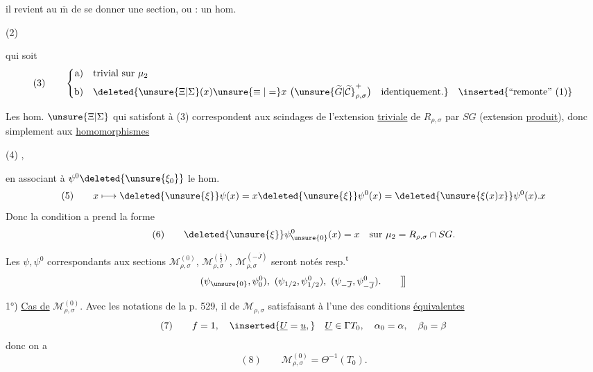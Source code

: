 
il revient au $\overline{\mathrm m}$ de se donner une section,
ou : un hom.

\noindent (2)\quad
{}

qui soit 
\[
\text{(3)}\qquad
\left\{\begin{aligned}
\text{a)}\quad &\text{trivial sur }\mu_2\\
\text{b)}\quad &\deleted{\unsure{\Xi|\Sigma}(x)\unsure{\equiv|=}x\ \bigl(\unsure{\widetilde G|\widetilde{\mathcal C}}^+_{\rho,\sigma}\bigr)\quad\text{identiquement}.}\quad\inserted{\text{``remonte'' (1)}}
\end{aligned}\right.
\]

Les hom. $\unsure{\Xi|\Sigma}$ qui satisfont à (3) correspondent
aux scindages de l'extension \uline{triviale} de
$R_{\rho,\sigma}$ par $SG$ (extension \uline{produit}), donc
simplement aux \uline{homomorphismes}

\noindent (4)\quad
{},



en associant à $\psi^0\deleted{\unsure{\xi_0}}$ le hom.
\[
(5)\qquad x\longmapsto \deleted{\unsure{\xi}}\psi(x)
=x\deleted{\unsure{\xi}}\psi^0(x)
=\deleted{\unsure{\xi(x)x}}\psi^0(x).x
\]
Donc la condition a prend la forme
\[
(6)\qquad \deleted{\unsure{\xi}}\psi^0_{\unsure{0}}(x)=x
\quad\text{sur }\mu_2=R_{\rho,\sigma}\cap SG.
\]

\margin{\deleted{\unsure{$\rho$}}}
Les $\psi,\psi^0$ correspondants aux  sections
$\mathcal M_{\rho,\sigma}^{(0)}$, $\mathcal M_{\rho,\sigma}^{(\frac12)}$,
$\mathcal M_{\rho,\sigma}^{(-\overline J)}$ seront notés resp.\textsuperscript{t}
\[
(\psi_{\unsure{0}},\psi^0_0),\ (\psi_{1/2},\psi^0_{1/2}),\
(\psi_{-\overline J},\psi^0_{-\overline J}).\qquad\big]\!\big]
\]

1°) \uline{Cas de} $\mathcal M_{\rho,\sigma}^{(0)}$. Avec les notations
de la p. 529, il \unsure{correspondra} 
\inserted{\unsure{$\underline u$}} de $\mathcal M_{\rho,\sigma}$ satisfaisant à l'une des conditions
\uline{équivalentes}
\[
(7)\qquad f=1,\quad\inserted{\underline U=\underline u,}\quad
\underline U\in\Gamma T_0,\quad \alpha_0=\alpha,\quad\beta_0=\beta
\]
donc on a
\[
(8)\qquad \mathcal M_{\rho,\sigma}^{(0)}=\Theta^{-1}(T_0).
\]

